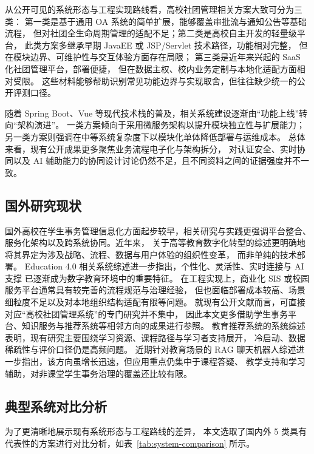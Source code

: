 从公开可见的系统形态与工程实现路线看，高校社团管理相关方案大致可分为三类：
第一类是基于通用 OA 系统的简单扩展，能够覆盖审批流与通知公告等基础流程，
但对社团全生命周期管理的适配不足；第二类是高校自主开发的轻量级平台，
此类方案多继承早期 JavaEE 或 JSP/Servlet 技术路径，功能相对完整，
但在模块边界、可维护性与交互体验方面存在局限；
第三类是近年来兴起的 SaaS 化社团管理平台，部署便捷，
但在数据主权、校内业务定制与本地化适配方面相对受限。
这些材料能够帮助识别常见功能边界与实现取舍，但往往缺少统一的公开评测口径。

随着 Spring Boot、Vue 等现代技术栈的普及，相关系统建设逐渐由“功能上线”转向“架构演进”。
一类方案倾向于采用微服务架构以提升模块独立性与扩展能力\cite{microservices2015}；
另一类方案则强调在中等系统复杂度下以模块化单体降低部署与运维成本\cite{microservices_patterns2018}。
总体来看，现有公开成果更多聚焦业务流程电子化与架构拆分，
对认证安全、实时协同以及 AI 辅助能力的协同设计讨论仍然不足，且不同资料之间的证据强度并不一致。

\subsection{国外研究现状}

国外高校在学生事务管理信息化方面起步较早，相关研究与实践更强调平台整合、
服务化架构以及跨系统协同\cite{microservices2015}。近年来，
关于高等教育数字化转型的综述更明确地将其界定为涉及战略、流程、数据与用户体验的组织性变革，
而非单纯的技术部署\cite{fernandez_he_dt_2023,mabotha_he_dt_2026}。
Education 4.0 相关系统综述进一步指出，个性化、灵活性、实时连接与 AI 支撑
已逐渐成为数字教育环境中的重要特征\cite{mukul_education4_2023}。
在工程实现上，商业化 SIS 或校园服务平台通常具有较完善的流程规范与治理经验，
但也面临部署成本较高、场景细粒度不足以及对本地组织结构适配有限等问题。
就现有公开文献而言，可直接对应“高校社团管理系统”的专门研究并不集中，
因此本文更多借助学生事务平台、知识服务与推荐系统等相邻方向的成果进行参照。
教育推荐系统的系统综述表明，现有研究主要围绕学习资源、课程路径与学习者支持展开，
冷启动、数据稀疏性与评价口径仍是高频问题\cite{urdaneta_education_rs_2021,deschenes_rs_2020}。
近期针对教育场景的 RAG 聊天机器人综述进一步指出，该方向虽增长迅速，但应用重点仍集中于课程答疑、
教学支持和学习辅助，对非课堂学生事务治理的覆盖还比较有限\cite{swacha_rag_education_2025}。

\subsection{典型系统对比分析}

为了更清晰地展示现有系统形态与工程路线的差异，
本文选取了国内外 5 类具有代表性的方案进行对比分析，如表~\ref{tab:system-comparison} 所示。

